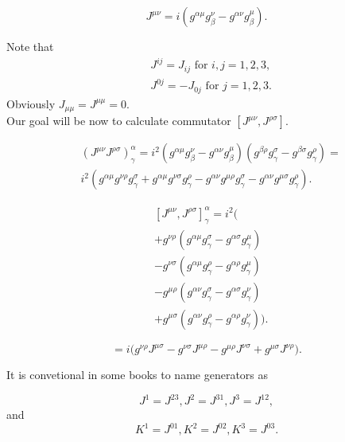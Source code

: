 \documentclass[main.tex]{subfiles}
\begin{document}
\begin{equation}
J^{\mu\nu} = i(g^{\alpha\mu} g^\nu_\beta - g^{\alpha\nu} g^\mu_\beta).
\end{equation}

Note that
\begin{align*}
& J^{ij} = J_{ij} \text{ for } i,j=1,2,3,\\
& J^{0j} = - J_{0j} \text{ for } j=1,2,3.
\end{align*}
Obviously $J_{\mu\mu} = J^{\mu\mu} = 0$.\\

Our goal will be now to calculate commutator $[J^{\mu\nu}, J^{\rho\sigma}]$.

\begin{align*}
& (J^{\mu\nu}J^{\rho\sigma})^\alpha_\gamma = i^2 (g^{\alpha\mu} g^\nu_\beta - g^{\alpha\nu} g^\mu_\beta)
(g^{\beta\rho} g^\sigma_\gamma - g^{\beta\sigma} g^\rho_\gamma) = \\
& i^2(g^{\alpha\mu}g^{\nu\rho}g^\sigma_\gamma + g^{\alpha\mu}g^{\nu\sigma}g^\rho_\gamma
- g^{\alpha\nu}g^{\mu\rho}g^\sigma_\gamma - g^{\alpha\nu}g^{\mu\sigma}g^\rho_\gamma).
\end{align*}

\begin{align*}
& [J^{\mu\nu}, J^{\rho\sigma}]^\alpha_\gamma = i^2
\big(\\
& + g^{\nu\rho }	(g^{\alpha\mu}g^\sigma_\gamma - g^{\alpha\sigma}g^\mu_\gamma)\\ 
& - g^{\nu\sigma} (g^{\alpha\mu}g^\rho_\gamma - g^{\alpha\rho}g^\mu_\gamma)\\
& - g^{\mu\rho}(g^{\alpha\nu}g^\sigma_\gamma - g^{\alpha\sigma}g^\nu_\gamma)\\
& + g^{\mu\sigma}(g^{\alpha\nu}g^\rho_\gamma - g^{\alpha\rho}g^\nu_\gamma)
\big).
\end{align*}

\begin{equation}
[J^{\mu\nu}, J^{\rho\sigma}] = 
i\big( g^{\nu\rho } J^{\mu\sigma} 
- g^{\nu\sigma} J^{\mu\rho}
- g^{\mu\rho} J^{\nu\sigma}
+ g^{\mu\sigma} J^{\nu\rho}\big).
\end{equation}

It is convetional in some books to name generators as 

\begin{equation}
J^1 = J^{23}, J^2 = J^{31}, J^3 = J^{12},
\end{equation}
and
\begin{equation}
K^1 = J^{01}, K^2 = J^{02}, K^3 = J^{03}.
\end{equation}
\end{document}
